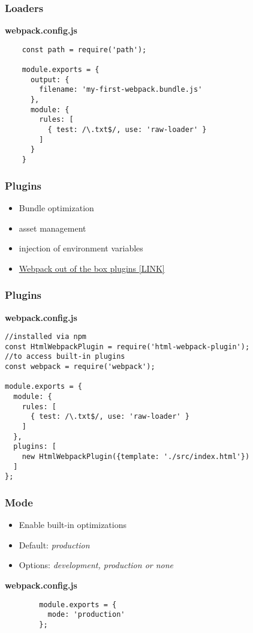 \begin{frame}[fragile]
    \frametitle{Loaders}
    \vfill
    \textbf{webpack.config.js}
    \begin{verbatim}
    const path = require('path');
    
    module.exports = {
      output: {
        filename: 'my-first-webpack.bundle.js'
      },
      module: {
        rules: [
          { test: /\.txt$/, use: 'raw-loader' }
        ]
      }
    }
    \end{verbatim}
\end{frame}

\begin{frame}
    \frametitle{Plugins}
    \begin{itemize}
        \item Bundle optimization
        \item asset management
        \item injection of environment variables
        \item \href{https://webpack.js.org/plugins/}{Webpack out of the box plugins [LINK]}
    \end{itemize}
\end{frame}

\begin{frame}[fragile]
    \frametitle{Plugins}
    \vfill
    \textbf{webpack.config.js}
    \begin{verbatim}
//installed via npm
const HtmlWebpackPlugin = require('html-webpack-plugin'); 
//to access built-in plugins
const webpack = require('webpack');
    
module.exports = {
  module: {
    rules: [
      { test: /\.txt$/, use: 'raw-loader' }
    ]
  },
  plugins: [
    new HtmlWebpackPlugin({template: './src/index.html'})
  ]
};
    \end{verbatim}
\end{frame}

\begin{frame}[fragile]
    \frametitle{Mode}
    \begin{itemize}
        \item Enable built-in optimizations
        \item Default: \textit{production}
        \item Options: \textit{development, production or none}
    \end{itemize}
    \vfill
    \textbf{webpack.config.js}
    \begin{verbatim}
        module.exports = {
          mode: 'production'
        };
    \end{verbatim}
\end{frame}